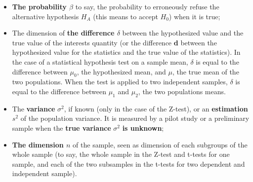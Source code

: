 \begin{frame}
  \vspace*{.5cm}
  \begin{itemize}
    \item \textbf{The probability {\boldmath${\beta}$}} to say, the probability to erroneously refuse the alternative hypothesis $ H_A $ (this means to accept $H_0$) when it is true;
    \vspace*{.5cm}
    \item The dimension of \textbf{the difference {\boldmath${\delta}$}} between the hypothesized value and the true value of the interests quantity (or the difference \textbf{d} between the hypothesized value for the statistics and the true value of the statistics). In the case of a statistical hypothesis test on a sample mean, ${\delta}$ is equal to the difference between $\mu_0$, the hypothesized mean, and $\mu$, the true mean of the two populations. When the test is applied to two independent samples, ${\delta}$ is equal to the difference between $\mu_1$ and $\mu_2$, the two populations means.
  \end{itemize}
\end{frame}

\begin{frame}
  \vspace*{.25cm}
  \begin{itemize}
    \item The \textbf{variance}{ \boldmath $ \sigma^2 $}, if known (only in the case of the Z-test), or an \textbf{estimation} {\boldmath $ {s^2} $} of the population variance. It is measured by a pilot study or a preliminary sample when the \textbf{true variance} {\boldmath$\sigma^2$} \textbf{is unknown};
    \vspace*{.25cm}
    \item \textbf{The dimension {\boldmath $ n $}} of the sample, seen as dimension of each subgroups of the whole sample (to say, the whole sample in the Z-test and t-tests for one sample, and each of the two subsamples in the t-tests for two dependent and independent sample).
  \end{itemize}
\end{frame}



